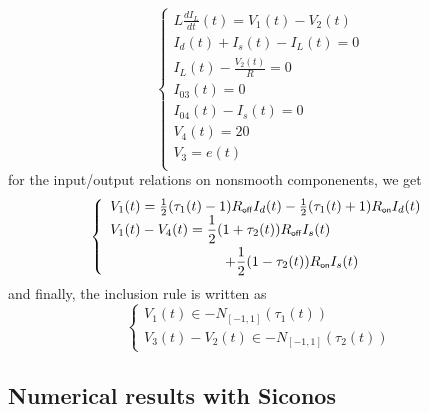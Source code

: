 \begin{equation}
  \label{eq:72}
 \left\{ 
    \begin{array}{l}
      L  \frac{dI_L}{dt}(t) = V_1(t)-V_2(t) \\
      I_d(t)+I_s(t)-I_L(t)=0 \\
      I_L(t)-\frac{V_2(t)}{R}=0\\
      I_{03}(t)=0\\
      I_{04}(t)-I_{s}(t)=0\\
      V_4(t)=20\\
      V_3=e(t)\\
\end{array}\right.
\end{equation}
for the input/output relations on nonsmooth componenents, we get
\begin{equation}
 \left\{ \begin{array}{l}
V_{1}(t)=\frac{1}{2}(\tau_{1}(t)-1)R_\off I_{d}(t)-\frac{1}{2}(\tau_{1}(t)+1) R_\on I_{d}(t) \\ 
\begin{split}
 V_{1}(t)-V_{4}(t)= \frac{1}{2}(1+\tau_{2}(t)) R_\off I_{s}(t)
  \quad\quad \\+\frac{1}{2}(1-\tau_{2}(t)) R_\on I_{s}(t)
\end{split}
  \end{array} \right.
\end{equation}
 and finally, the inclusion rule is written as
\begin{equation}
  \left\{\begin{array}{l}
      V_{1}(t) \in - N_{[-1,1]}(\tau_{1}(t)) \\   V_{3}(t)-V_{2}(t) \in -N_{[-1,1]}(\tau_{2}(t))
    \end{array} 
\right.
\end{equation}

\subsection{Numerical results with {\sc Siconos}}
\label{section32}

